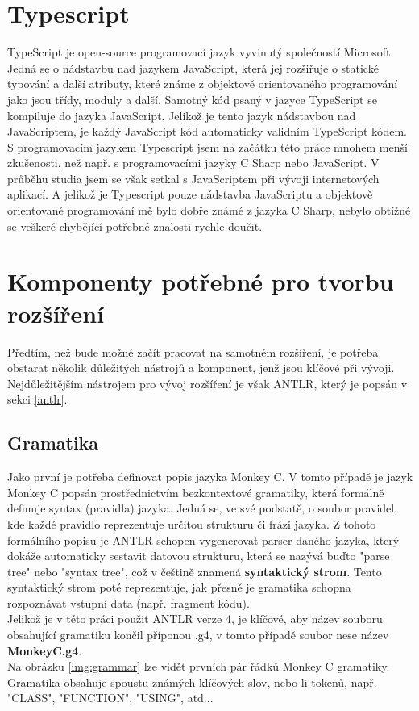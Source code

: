 \section{Typescript}
TypeScript \cite{TypeScript_wikipedia_2020} je open-source programovací jazyk vyvinutý společností Microsoft. Jedná se o nádstavbu nad jazykem JavaScript,
která jej rozšiřuje o statické typování a další atributy, které známe z objektově orientovaného programování jako jsou třídy, moduly a další. Samotný kód psaný v jazyce TypeScript se kompiluje do jazyka JavaScript. Jelikož je tento jazyk nádstavbou nad JavaScriptem, je každý JavaScript kód automaticky validním TypeScript kódem.\\
S programovacím jazykem Typescript jsem na začátku této práce mnohem menší zkušenosti, než např. s programovacími jazyky C Sharp nebo JavaScript. V průběhu studia jsem se však setkal s JavaScriptem při vývoji internetových aplikací. A jelikož je Typescript pouze nádstavba JavaScriptu a objektově orientované programování mě bylo dobře známé z jazyka C Sharp, nebylo obtížné se veškeré chybějící potřebné znalosti rychle doučit.

\section{Komponenty potřebné pro tvorbu rozšíření}
Předtím, než bude možné začít pracovat na samotném rozšíření, je potřeba obstarat několik důležitých nástrojů a komponent, jenž jsou klíčové při vývoji. Nejdůležitějším nástrojem pro vývoj rozšíření je však ANTLR, který je popsán v sekci \ref{antlr}.

\subsection{Gramatika}
Jako první je potřeba definovat popis jazyka Monkey C. V tomto případě je jazyk Monkey C popsán prostřednictvím bezkontextové gramatiky, která formálně definuje syntax (pravidla) jazyka. Jedná se, ve své podstatě, o soubor pravidel, kde každé pravidlo reprezentuje určitou strukturu či frázi jazyka. Z tohoto formálního popisu je ANTLR schopen vygenerovat parser daného jazyka, který dokáže automaticky sestavit datovou strukturu, která se nazývá buďto "parse tree" nebo "syntax tree", což v češtině znamená \textbf{syntaktický strom}. Tento syntaktický strom poté reprezentuje, jak přesně je gramatika schopna rozpoznávat vstupní data (např. fragment kódu).\\
Jelikož je v této práci použit ANTLR verze 4, je klíčové, aby název souboru obsahující gramatiku končil příponou .g4, v tomto případě soubor nese název \textbf{MonkeyC.g4}. 
\\
Na obrázku \ref{img:grammar} lze vidět prvních pár řádků Monkey C gramatiky. Gramatika obsahuje spoustu známých klíčových slov, nebo-li tokenů, např. "CLASS", "FUNCTION", "USING", atd...

